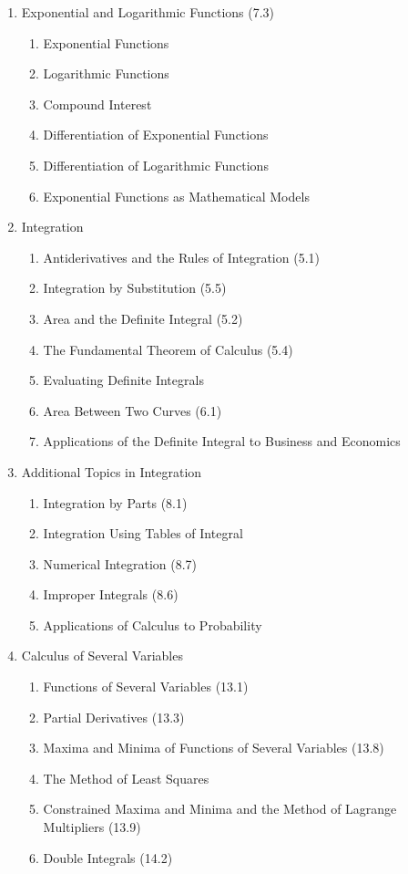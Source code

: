 \documentclass{amsart}
\begin{document}
\begin{enumerate}
\begin{enumerate}
	\end{enumerate}
\item Exponential and Logarithmic Functions (7.3)
	\begin{enumerate}
	\item Exponential Functions
	\item Logarithmic Functions
	\item Compound Interest
	\item Differentiation of Exponential Functions
	\item Differentiation of Logarithmic Functions
	\item Exponential Functions as Mathematical Models
	\end{enumerate}
\item Integration
 	\begin{enumerate}
	\item Antiderivatives and the Rules of Integration (5.1)
	\item Integration by Substitution (5.5)
	\item Area and the Definite Integral (5.2)
	\item The Fundamental Theorem of Calculus (5.4)
	\item Evaluating Definite Integrals
	\item Area Between Two Curves (6.1)
	\item Applications of the Definite Integral to Business and Economics
	\end{enumerate}
\item Additional Topics in Integration
	\begin{enumerate}
	\item Integration by Parts (8.1)
	\item Integration Using Tables of Integral
	\item Numerical Integration (8.7)
	\item Improper Integrals (8.6)
	\item Applications of Calculus to Probability
	\end{enumerate}
\item Calculus of Several Variables
	\begin{enumerate}
	\item Functions of Several Variables (13.1)
	\item Partial Derivatives (13.3)
	\item Maxima and Minima of Functions of Several Variables (13.8)
	\item The Method of Least Squares
	\item Constrained Maxima and Minima and the Method of Lagrange Multipliers (13.9)
	\item Double Integrals (14.2)
	\end{enumerate}
\end{enumerate}
\end{document}
